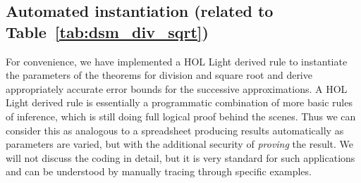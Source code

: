 \documentclass[10pt]{article}
\theoremstyle{definition}
\theoremstyle{remark}
\numberwithin{equation}{section}
\begin{document}
\subsection{Automated instantiation (related to Table~\ref{tab:dsm_div_sqrt})}

For convenience, we have implemented a HOL Light derived rule to instantiate
the parameters of the theorems for division and square root and derive
appropriately accurate error bounds for the successive approximations. A HOL
Light derived rule is essentially a programmatic combination of more basic
rules of inference, which is still doing full logical proof behind the scenes.
Thus we can consider this as analogous to a spreadsheet producing results
automatically as parameters are varied, but with the additional security of
{\em proving} the result. We will not discuss the coding in detail, but it is
very standard for such applications and can be understood by manually tracing
through specific examples.
\end{document}
